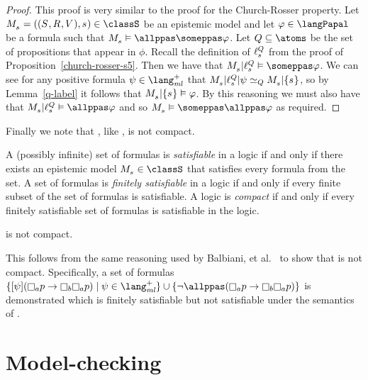 \begin{proof}
This proof is very similar to the proof for the Church-Rosser property.
Let $\kPModelAndTuple{\kStateS} \in \classS$ be an epistemic model and let $\phi \in \langPapal$ be a formula such that $\kPModel{\kStateS} \entails \allppas \someppas \phi$.
Let $\atomsQ \subseteq \atoms$ be the set of propositions that appear in $\phi$.
Recall the definition of $\ell^{\atomsQ}_{\kStateS}$ from the proof of Proposition~\ref{church-rosser-s5}.
Then we have that $\restrict{\kPModel{\kStateS}}{\ell^{\atomsQ}_{\kStateS}} \entails \someppas \phi$.
We can see for any positive formula $\psi \in \langMlPlus$ that $\restrict{\restrict{\kPModel{\kStateS}}{\ell^{\atomsQ}_{\kStateS}}}{\psi} \bisimilar[\atomsQ] \restrict{\kPModel{\kStateS}}{\{\kStateS\}}$, so by Lemma~\ref{q-label} it follows that $\restrict{\kPModel{\kStateS}}{\{\kStateS\}} \entails \phi$.
By this reasoning we must also have that $\restrict{\kPModel{\kStateS}}{\ell^{\atomsQ}_{\kStateS}} \entails \allppas \phi$ and so $\kPModel{\kStateS} \entails \someppas \allppas \phi$ as required.
\end{proof}

Finally we note that \logicPapalS{}, like \logicApalS{}, is not compact.

A (possibly infinite) set of formulas is {\em satisfiable} in a logic if and only if there exists an epistemic model $\kPModel{\kStateS} \in \classS$ that satisfies every formula from the set. 
A set of formulas is {\em finitely satisfiable} in a logic if and only if every finite subset of the set of formulas is satisfiable.
A logic is {\em compact} if and only if every finitely satisfiable set of formulas is satisfiable in the logic.

\begin{proposition}
\logicPapalS{} is not compact.
\end{proposition}

This follows from the same reasoning used by Balbiani, et al.~\cite{balbiani:2008} to show that \logicApalS{} is not compact.
Specifically, a set of formulas $\{\announceA{\psi} (\knowsA \atomP \implies \knowsB \knowsA \atomP) \mid \psi \in \langMlPlus\} \cup \{\neg \allppas (\knowsA \atomP \implies \knowsB \knowsA \atomP)\}$ is demonstrated which is finitely satisfiable but not satisfiable under the semantics of \logicPapalS{}.

\section{Model-checking}\label{model-checking}

